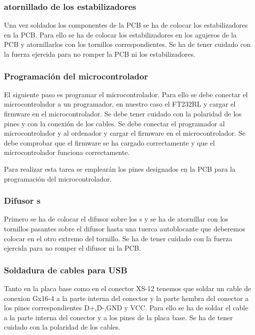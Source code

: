 \subsubsection{atornillado de los estabilizadores}
Una vez soldados los componentes de la \gls{PCB} se ha de colocar los estabilizadores en la \gls{PCB}. Para ello se ha de colocar los estabilizadores en los agujeros de la \gls{PCB} y atornillarlos con los tornillos correspondientes. Se ha de tener cuidado con la fuerza ejercida para no romper la \gls{PCB} ni los estabilizadores.

\subsubsection{Programación del microcontrolador}
El siguiente paso es programar el microcontrolador. Para ello se debe conectar el microcontrolador a un programador, en nuestro caso el FT232RL y cargar el firmware en el microcontrolador. Se debe tener cuidado con la polaridad de los pines y con la conexión de los cables. Se debe conectar el programador al microcontrolador y al ordenador y cargar el firmware en el microcontrolador. Se debe comprobar que el firmware se ha cargado correctamente y que el microcontrolador funciona correctamente.

Para realizar esta tarea se emplearán los pines designados en la \gls{PCB} para la programación del microcontrolador.

\subsubsection{Difusor s}
Primero se ha de colocar el difusor sobre los s y se ha de atornillar con los tornillos pasantes sobre el difusor hasta una tuerca autoblocante que deberemos colocar en el otro extremo del tornillo. Se ha de tener cuidado con la fuerza ejercida para no romper el difusor ni la \gls{PCB}.

\subsubsection{Soldadura de cables para \gls{USB}}
Tanto en la placa base como en el conector XS-12 tenemos que soldar un cable de conexion Gx16-4 a la parte interna del conector y la parte hembra del conector a los pines correspondientes D+,D-,GND y VCC. Para ello se ha de soldar el cable a la parte interna del conector y a los pines de la placa base. Se ha de tener cuidado con la polaridad de los cables.

